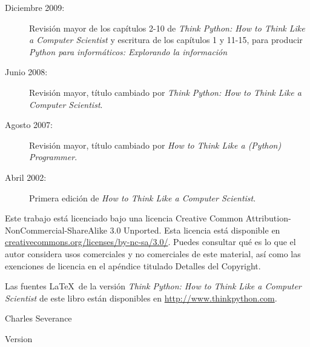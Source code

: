 \begin{latexonly}
{\begin{description}
\item[Diciembre 2009:] Revisión mayor de los capítulos 2-10 de
\emph{Think Python: How to Think Like
a Computer Scientist}
y escritura de los capítulos 1 y 11-15, para
producir 
\emph{Python para informáticos: Explorando la información}

\item[Junio 2008:] Revisión mayor, título cambiado por
\emph{Think Python: How to Think Like
a Computer Scientist}.

\item[Agosto 2007:] Revisión mayor, título cambiado por
\emph{How to Think Like a (Python) Programmer}.

\item[Abril 2002:] Primera edición de \emph{How to Think Like
a Computer Scientist}.

\end{description}

\vspace{0.2in}

Este trabajo está licenciado bajo una licencia
Creative Common
Attribution-NonCommercial-ShareAlike 3.0 Unported.
Esta licencia está
disponible en
\url{creativecommons.org/licenses/by-nc-sa/3.0/}. Puedes
consultar qué es lo que el autor considera usos comerciales y no comerciales
de este material, así como las exenciones de licencia
en el apéndice titulado Detalles del Copyright.

Las fuentes \LaTeX\ de la versión 
\emph{Think Python: How to Think Like
	a Computer Scientist}
de este libro están disponibles en
\url{http://www.thinkpython.com}.

\vspace{0.2in}

} %

\end{latexonly}



\begin{htmlonly}


{\Large \thetitle}

{\large 
Charles Severance}

Version \theversion

\setcounter{chapter}{-1}

\end{htmlonly}
